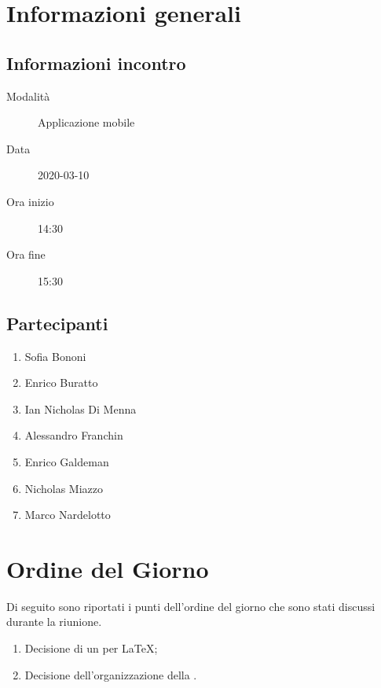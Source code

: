 \documentclass{article}
\begin{document}


\section{Informazioni generali}%
\label{sec:informazioni_generali}

\subsection{Informazioni incontro}%
\label{sub:informazioni_incontro}

\begin{description}
  \item[Modalità] Applicazione mobile 
  \item[Data] 2020-03-10
  \item[Ora inizio] 14:30
  \item[Ora fine] 15:30
\end{description}

\subsection{Partecipanti}%
\label{sub:partecipanti}

\begin{enumerate}
  \item Sofia Bononi
  \item Enrico Buratto
  \item Ian Nicholas Di Menna
  \item Alessandro Franchin
  \item Enrico Galdeman
  \item Nicholas Miazzo
  \item Marco Nardelotto
\end{enumerate}

\section{Ordine del Giorno}%
\label{ordine_del_giorno}
Di seguito sono riportati i punti dell'ordine del giorno che sono stati discussi durante la riunione.
\begin{enumerate}
  \item Decisione di un  per \LaTeX;
  \item Decisione dell'organizzazione della .
\end{enumerate}
\end{document}

